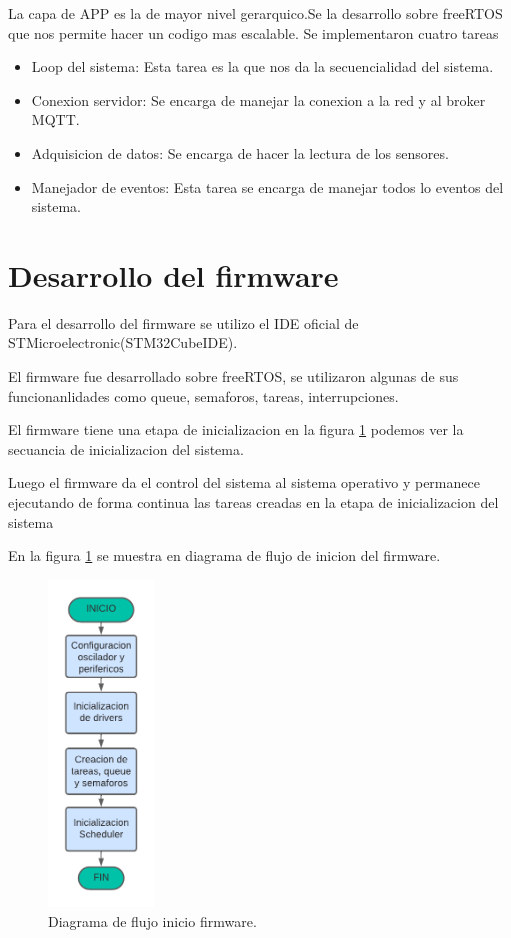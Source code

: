 La capa de APP es la de mayor nivel gerarquico.Se la desarrollo sobre freeRTOS que nos permite hacer un codigo mas escalable.
Se implementaron cuatro tareas
\begin{itemize}
    \item Loop del sistema: Esta tarea es la que nos da la secuencialidad del sistema.
    \item Conexion servidor: Se encarga de manejar la conexion a la red y al broker MQTT.
    \item Adquisicion de datos: Se encarga de hacer la lectura de los sensores.
    \item Manejador de eventos: Esta tarea se encarga de manejar todos lo eventos del sistema.
  \end{itemize}

\section{Desarrollo del firmware}
Para el desarrollo del firmware se utilizo el IDE oficial de STMicroelectronic(STM32CubeIDE).

El firmware fue desarrollado sobre freeRTOS, se utilizaron algunas de sus funcionanlidades como queue, semaforos, tareas, interrupciones.

El firmware tiene una etapa de inicializacion en la figura \ref{fig:Df inicio firmware} podemos ver la secuancia de inicializacion del sistema.

Luego el firmware da el control del sistema al sistema operativo y permanece ejecutando de forma continua las tareas creadas en la etapa de inicializacion del sistema 


En la figura \ref{fig:Df inicio firmware}  se muestra en diagrama de flujo de inicion del firmware.

\begin{figure}[htbp]
  \centering
	\includegraphics[width=0.25\textwidth]{./Figures/DF inicio firmware.png}
	\caption{Diagrama de flujo inicio firmware.}
	\label{fig:Df inicio firmware}
\end{figure}


